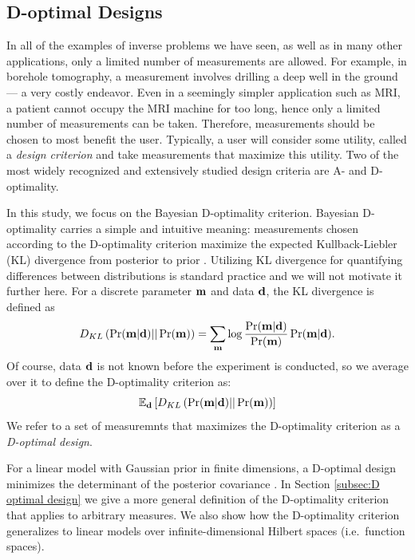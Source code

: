 \subsection{D-optimal Designs}\label{subsec:D}
In all of the examples of inverse problems we have seen, as well as in
many other applications, only a limited number of measurements are
allowed. For example, in borehole tomography, a measurement involves
drilling a deep well in the ground --- a very costly endeavor. Even in
a seemingly simpler application such as MRI, a patient cannot occupy
the MRI machine for too long, hence only a limited number of
measurements can be taken. Therefore, measurements should be chosen to
most benefit the user. Typically, a user will consider some utility,
called a \emph{design criterion} and take measurements that maximize
this utility. Two of the most widely recognized and extensively
studied design criteria are A- and D-optimality.

In this study, we focus on the Bayesian D-optimality
criterion. Bayesian D-optimality carries a simple and intuitive
meaning: measurements chosen according to the D-optimality criterion
maximize the expected Kullback-Liebler (KL) divergence from posterior
to prior \cite{chaloner1995, AlexanderianGloorGhattas14,
  CoverThomas91}. Utilizing KL divergence for quantifying differences
between distributions is standard practice and we will not motivate it
further here. For a discrete parameter $\mathbf{m}$ and data $\mathbf{d}$, the
KL divergence is defined as
\begin{equation}\label{eq:basic KL}
  D_{KL}\left (\Pr(\param|\data)||\Pr(\param)\right ) =  \sum_{\param} \log
  \frac{\Pr(\param|\data)}{\Pr(\param)} \Pr(\param|\data). 
\end{equation}
Of course, data $\mathbf{d}$ is not known before the experiment is
conducted, so we average over it to define the D-optimality criterion
as:
\begin{equation*}
  \mathbb{E}_{\data}\left [ D_{KL}\left (\Pr(\param|\data)||\Pr(\param)\right ) \right ]
\end{equation*}
We refer to a set of measuremnts that maximizes the D-optimality
criterion as a \emph{D-optimal design}.

For a linear model with Gaussian prior in finite dimensions, a
D-optimal design minimizes the determinant of the posterior covariance
\cite{chaloner1995}. In Section \ref{subsec:D optimal design} we give
a more general definition of the D-optimality criterion that applies
to arbitrary measures. We also show how the D-optimality criterion
generalizes to linear models over infinite-dimensional Hilbert spaces
(i.e.~function spaces).

